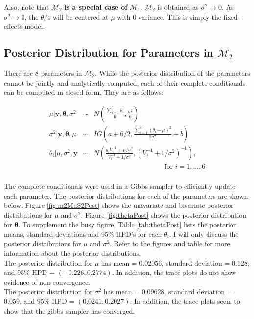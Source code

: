 \documentclass{../../tex_template/asaproc}
\newcommand{\p}[1]{\left(#1\right)}
\newcommand{\ds}{ \displaystyle }
\newcommand{\M}{\mathcal{M}}
\newcommand{\sumk}{\sum_{i=1}^6}
\begin{document}
Also, note that $\M_2$ \textbf{is a special case of} $\M_1$. $\M_2$ is
obtained as $\sigma^2 \rightarrow 0$. As $\sigma^2 \rightarrow 0$, 
the $\theta_i$'s will be centered at $\mu$ with 0 variance. This
is simply the fixed-effects model.

\subsection{Posterior Distribution for Parameters in $\M_2$}
There are 8 parameters in $\M_2$. While the posterior distribution of the
parameters cannot be jointly and analytically computed, each of their complete
conditionals can be computed in closed form. They are as follows:

\newcommand{\ivy}{\sumk V_i^{-1}}
$$
\begin{array}{rcl}
  \mu | \bm y,\bm\theta,\sigma^2  &\sim& 
  N\p{\ds\frac{\sumk \theta_i}{6},\ds\frac{\sigma^2}{6}}\\
  \sigma^2 | \bm y,\bm\theta , \mu &\sim& 
  IG\p{a+6/2,\ds\frac{\sumk(\theta_i-\mu)^2}{2\sigma^2}+b}\\
  \theta_i | \mu, \sigma^2, \bm y &\sim& 
  N\p{\ds\frac{y_iV_i^{-1}+\mu/\sigma^2}{V_i^{-1}+1/\sigma^2},\p{V_i^{-1}+1/\sigma^2}^{-1}},\\
  &&\hspace{10em} \text{~for~} i=1,...,6\\
\end{array}
$$

The complete conditionals were used in a Gibbs sampler to efficiently update
each parameter. The posterior distributions for each of the parameters are
shown below. Figure \ref{fig:m2MuS2Post} shows the univariate and bivariate
posterior distributions for $\mu$ and $\sigma^2$. Figure \ref{fig:thetaPost}
shows the posterior distribution for $\bm\theta$. To supplement the busy
figure, Table \ref{tab:thetaPost} lists the posterior means, standard
deviations and 95\% HPD's for each $\theta_i$. I will only discuss the
posterior distributions for $\mu$ and $\sigma^2$. Refer to the figures and
table for more information about the posterior distributions.\\

The posterior distribution for $\mu$ has mean = 0.02056, standard deviation
= 0.128, and 95\% HPD = $(-0.226,0.2774)$. In addition, the trace plots
do not show evidence of non-convergence.\\

The posterior distribution for $\sigma^2$ has mean = 0.09628, standard deviation
= 0.059, and 95\% HPD = $(0.0241,0.2027)$. In addition, the trace plots
seem to show that the gibbs sampler has converged.\\
\end{document}
